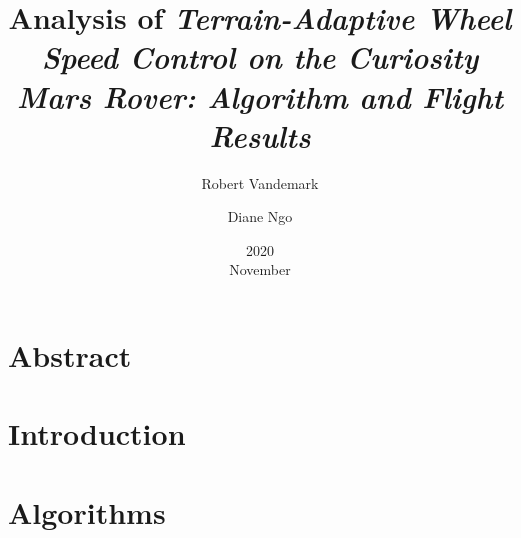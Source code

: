 \documentclass[11pt]{report}
\title{Analysis of \em{Terrain-Adaptive Wheel Speed Control on the Curiosity Mars Rover: Algorithm and Flight Results}}
\date{2020\\ November}
\author{Robert Vandemark \and Diane Ngo}
\begin{document}
	\renewcommand*{\thepage}{\arabic{page}}
	\setcounter{page}{1}
	\maketitle

	\tableofcontents
	\newpage

	\chapter{Abstract}
	

	\chapter{Introduction}
	
	
	\chapter{Algorithms}
	

	\begin{center}
		\printbibliography[heading=bibintoc, title={Bibliography}]
	\end{center}
\end{document}
